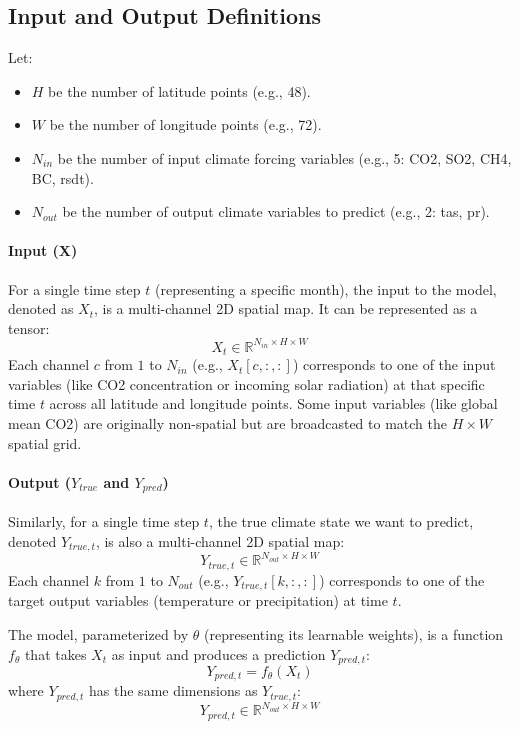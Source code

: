 \documentclass{article}
\begin{document}
\subsection{Input and Output Definitions}

Let:
\begin{itemize}
    \item \(H\) be the number of latitude points (e.g., 48).
    \item \(W\) be the number of longitude points (e.g., 72).
    \item \(N_{in}\) be the number of input climate forcing variables (e.g., 5: CO2, SO2, CH4, BC, rsdt).
    \item \(N_{out}\) be the number of output climate variables to predict (e.g., 2: tas, pr).
\end{itemize}

\paragraph{Input (X)}
For a single time step \(t\) (representing a specific month), the input to the model, denoted as \(X_t\), is a multi-channel 2D spatial map. It can be represented as a tensor:
\[ X_t \in \mathbb{R}^{N_{in} \times H \times W} \]
Each channel \(c\) from \(1\) to \(N_{in}\) (e.g., \(X_t[c, :, :]\)) corresponds to one of the input variables (like CO2 concentration or incoming solar radiation) at that specific time \(t\) across all latitude and longitude points. Some input variables (like global mean CO2) are originally non-spatial but are broadcasted to match the \(H \times W\) spatial grid.

\paragraph{Output ($Y_{true}$ and $Y_{pred}$)}
Similarly, for a single time step \(t\), the true climate state we want to predict, denoted \(Y_{true,t}\), is also a multi-channel 2D spatial map:
\[ Y_{true,t} \in \mathbb{R}^{N_{out} \times H \times W} \]
Each channel \(k\) from \(1\) to \(N_{out}\) (e.g., \(Y_{true,t}[k, :, :]\)) corresponds to one of the target output variables (temperature or precipitation) at time \(t\).

The model, parameterized by \(\theta\) (representing its learnable weights), is a function \(f_\theta\) that takes \(X_t\) as input and produces a prediction \(Y_{pred,t}\):
\[ Y_{pred,t} = f_\theta(X_t) \]
where \( Y_{pred,t} \) has the same dimensions as \( Y_{true,t} \):
\[ Y_{pred,t} \in \mathbb{R}^{N_{out} \times H \times W} \]
\end{document}
